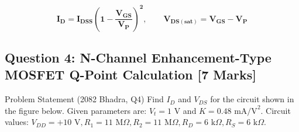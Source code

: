 \documentclass[11pt,a4paper,oneside]{book}
\begin{document}
\begin{answerbox}
$$\mathbf{I_D = I_{DSS}\left(1 - \frac{V_{GS}}{V_P}\right)^2, \qquad V_{DS(\text{sat})} = V_{GS} - V_P}$$
\end{answerbox}

\vspace{0.6cm}

\subsection{Question 4: N-Channel Enhancement-Type MOSFET Q-Point Calculation [7 Marks]}
\begin{questionbox}{Problem Statement (2082 Bhadra, Q4)}
Find $I_D$ and $V_{DS}$ for the circuit shown in the figure below. Given parameters are: $V_t = 1\text{ V}$ and $K = 0.48\text{ mA/V}^2$.
Circuit values: $V_{DD} = +10\text{ V}, R_1 = 11\text{ M}\Omega, R_2 = 11\text{ M}\Omega, R_D = 6\text{ k}\Omega, R_S = 6\text{ k}\Omega$.
\end{questionbox}
\end{document}
